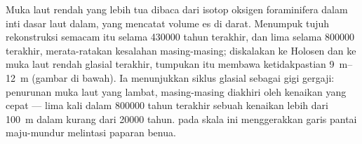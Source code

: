 Muka laut rendah yang lebih tua dibaca dari isotop oksigen foraminifera dalam inti dasar laut dalam, yang mencatat volume es di darat. Menumpuk tujuh rekonstruksi semacam itu selama \num{430000} tahun terakhir, dan lima selama \num{800000} terakhir, merata-ratakan kesalahan masing-masing; diskalakan ke Holosen dan ke muka laut rendah glasial terakhir, tumpukan itu membawa ketidakpastian \qtyrange{9}{12}{m} (gambar di bawah). Ia menunjukkan siklus glasial sebagai gigi gergaji: penurunan muka laut yang lambat, masing-masing diakhiri oleh kenaikan yang cepat --- lima kali dalam \num{800000} tahun terakhir sebuah kenaikan lebih dari \qty{100}{m} dalam kurang dari \num{20000} tahun.  pada skala ini menggerakkan garis pantai maju-mundur melintasi paparan benua.

